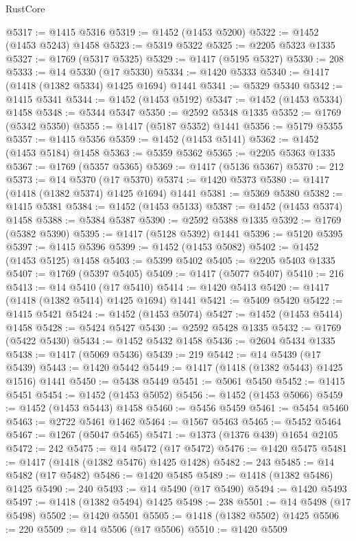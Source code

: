 \begin{lexlean}{RustCore}
\begin{coremodule}
@5317 := @1415 @5316
@5319 := @1452 (@1453 @5200)
@5322 := @1452 (@1453 @5243) @1458
@5323 := @5319 @5322
@5325 := @2205 @5323 @1335
@5327 := @1769 (@5317 @5325)
@5329 := @1417 (@5195 @5327)
@5330 := 208
@5333 := @14 @5330 (@17 @5330)
@5334 := @1420 @5333
@5340 := @1417 (@1418 (@1382 @5334) @1425 @1694) @1441
@5341 := @5329 @5340
@5342 := @1415 @5341
@5344 := @1452 (@1453 @5192)
@5347 := @1452 (@1453 @5334) @1458
@5348 := @5344 @5347
@5350 := @2592 @5348 @1335
@5352 := @1769 (@5342 @5350)
@5355 := @1417 (@5187 @5352) @1441
@5356 := @5179 @5355
@5357 := @1415 @5356
@5359 := @1452 (@1453 @5141)
@5362 := @1452 (@1453 @5184) @1458
@5363 := @5359 @5362
@5365 := @2205 @5363 @1335
@5367 := @1769 (@5357 @5365)
@5369 := @1417 (@5136 @5367)
@5370 := 212
@5373 := @14 @5370 (@17 @5370)
@5374 := @1420 @5373
@5380 := @1417 (@1418 (@1382 @5374) @1425 @1694) @1441
@5381 := @5369 @5380
@5382 := @1415 @5381
@5384 := @1452 (@1453 @5133)
@5387 := @1452 (@1453 @5374) @1458
@5388 := @5384 @5387
@5390 := @2592 @5388 @1335
@5392 := @1769 (@5382 @5390)
@5395 := @1417 (@5128 @5392) @1441
@5396 := @5120 @5395
@5397 := @1415 @5396
@5399 := @1452 (@1453 @5082)
@5402 := @1452 (@1453 @5125) @1458
@5403 := @5399 @5402
@5405 := @2205 @5403 @1335
@5407 := @1769 (@5397 @5405)
@5409 := @1417 (@5077 @5407)
@5410 := 216
@5413 := @14 @5410 (@17 @5410)
@5414 := @1420 @5413
@5420 := @1417 (@1418 (@1382 @5414) @1425 @1694) @1441
@5421 := @5409 @5420
@5422 := @1415 @5421
@5424 := @1452 (@1453 @5074)
@5427 := @1452 (@1453 @5414) @1458
@5428 := @5424 @5427
@5430 := @2592 @5428 @1335
@5432 := @1769 (@5422 @5430)
@5434 := @1452 @5432 @1458
@5436 := @2604 @5434 @1335
@5438 := @1417 (@5069 @5436)
@5439 := 219
@5442 := @14 @5439 (@17 @5439)
@5443 := @1420 @5442
@5449 := @1417 (@1418 (@1382 @5443) @1425 @1516) @1441
@5450 := @5438 @5449
@5451 := @5061 @5450
@5452 := @1415 @5451
@5454 := @1452 (@1453 @5052)
@5456 := @1452 (@1453 @5066)
@5459 := @1452 (@1453 @5443) @1458
@5460 := @5456 @5459
@5461 := @5454 @5460
@5463 := @2722 @5461 @1462
@5464 := @1567 @5463
@5465 := @5452 @5464
@5467 := @1267 (@5047 @5465)
@5471 := @1373 (@1376 @439) @1654 @2105
@5472 := 242
@5475 := @14 @5472 (@17 @5472)
@5476 := @1420 @5475
@5481 := @1417 (@1418 (@1382 @5476) @1425 @1428)
@5482 := 243
@5485 := @14 @5482 (@17 @5482)
@5486 := @1420 @5485
@5489 := @1418 (@1382 @5486) @1425
@5490 := 240
@5493 := @14 @5490 (@17 @5490)
@5494 := @1420 @5493
@5497 := @1418 (@1382 @5494) @1425
@5498 := 238
@5501 := @14 @5498 (@17 @5498)
@5502 := @1420 @5501
@5505 := @1418 (@1382 @5502) @1425
@5506 := 220
@5509 := @14 @5506 (@17 @5506)
@5510 := @1420 @5509

\end{coremodule}
\end{lexlean}
